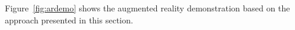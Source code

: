\documentclass[12pt,a4paper,oneside,openright]{book}
\newcommand{\fig}[1]{Figure~\ref{fig:#1}}
\begin{document}
\begin{CJK}{UTF8}{}
\fig{ardemo} shows the augmented reality demonstration based on the approach presented in this section.
\begin{figure}[htbp]
  \begin{center}
    \medskip\\

\end{center}
\end{figure}
\end{CJK}
\end{document}
